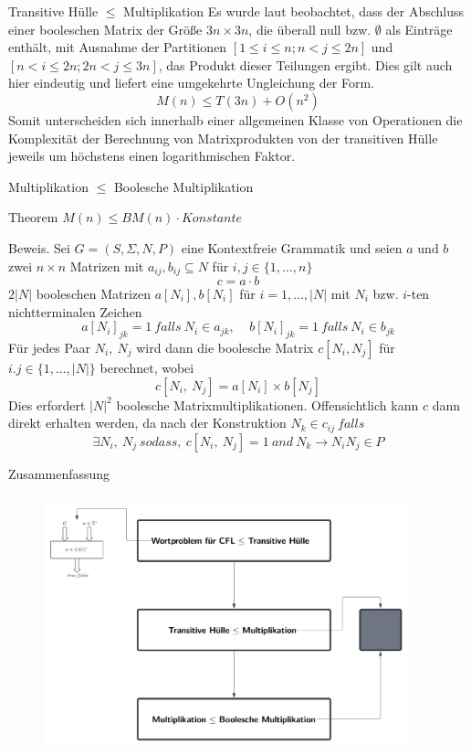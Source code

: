 \documentclass{beamer}
\begin{document}
	\begin{frame}{Transitive Hülle $\le$ Multiplikation}
		Es wurde laut \cite{booleanmatrix} beobachtet, dass der Abschluss einer booleschen Matrix der Größe $3n \times 3n$, die überall null bzw. $\emptyset$ als Einträge enthält, mit Ausnahme der Partitionen $[1 \le i \le n; n < j \le 2n]$ und $[n < i \le 2n; 2n < j \le 3n]$, das Produkt dieser Teilungen ergibt. Dies gilt auch hier eindeutig und liefert eine umgekehrte Ungleichung der Form.
		$$M(n) \le T(3n) + O(n^2)$$
		Somit unterscheiden sich innerhalb einer allgemeinen Klasse von Operationen die Komplexität der Berechnung von Matrixprodukten von der transitiven Hülle jeweils um höchstens einen logarithmischen Faktor.
	\end{frame}

	\begin{frame}{Multiplikation $\le$ Boolesche Multiplikation}
		\begin{block}{Theorem}
			$M(n) \le BM(n) \cdot Konstante$
		\end{block}
		Beweis. Sei $G = (S, \Sigma, N, P)$ eine Kontextfreie Grammatik und seien $a$ und $b$ zwei $n \times n$ Matrizen mit $a_{ij},b_{ij}\subseteq N$ für $i,j\in\{1,\ldots ,n\}$
		$$c = a\cdot b$$
		$2|N|$ booleschen Matrizen $a[N_i], b[N_i]$ für $i=1,\ldots,|N|$ mit $N_i$ bzw. $i$-ten nichtterminalen Zeichen 
		$$a[N_i]_{jk} = 1 \ falls \ N_i \in a_{jk}, \ \ \ \ \ b[N_i]_{jk} = 1 \ falls \ N_i \in b_{jk}$$
		Für jedes Paar $N_i,\ N_j$ wird dann die boolesche Matrix $c[N_i, N_j]$ für $i.j \in \{1,\ldots,|N|\}$ berechnet, wobei
		$$c[N_i,\ N_j] = a[N_i] \times b[N_j]$$
		Dies erfordert ${|N|}^2$ boolesche Matrixmultiplikationen. Offensichtlich kann $c$ dann direkt erhalten werden, da nach der Konstruktion $N_k \in c_{ij} \ falls$
		$$\exists N_i,\ N_j \ so dass, \ c[N_i,\ N_j] = 1 \ and\ N_k \to N_i N_j  \in P$$
	\end{frame}

	\begin{frame}{Zusammenfassung}
			\begin{figure}
			\centering
			\includegraphics[width=10.5cm,height=7.5cm]{img/ZusammenfassungT}
		\end{figure}
	\end{frame}
	
\end{document}
